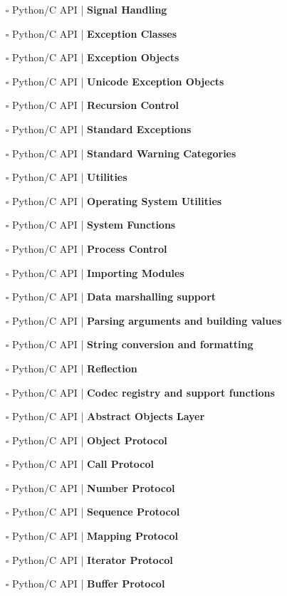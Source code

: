 \documentclass[a4, landscape, 12pt]{article}
\newcommand{\checkbox}{$\square$}%
\begin{document}
\begin{itemize}
{}
\item [\checkbox]  Python/C API | \textbf{ Signal Handling
}
\item [\checkbox]  Python/C API | \textbf{ Exception Classes
}
\item [\checkbox]  Python/C API | \textbf{ Exception Objects
}
\item [\checkbox]  Python/C API | \textbf{ Unicode Exception Objects
}
\item [\checkbox]  Python/C API | \textbf{ Recursion Control
}
\item [\checkbox]  Python/C API | \textbf{ Standard Exceptions
}
\item [\checkbox]  Python/C API | \textbf{ Standard Warning Categories
}
\item [\checkbox]  Python/C API | \textbf{ Utilities
}
\item [\checkbox]  Python/C API | \textbf{ Operating System Utilities
}
\item [\checkbox]  Python/C API | \textbf{ System Functions
}
\item [\checkbox]  Python/C API | \textbf{ Process Control
}
\item [\checkbox]  Python/C API | \textbf{ Importing Modules
}
\item [\checkbox]  Python/C API | \textbf{ Data marshalling support
}
\item [\checkbox]  Python/C API | \textbf{ Parsing arguments and building values
}
\item [\checkbox]  Python/C API | \textbf{ String conversion and formatting
}
\item [\checkbox]  Python/C API | \textbf{ Reflection
}
\item [\checkbox]  Python/C API | \textbf{ Codec registry and support functions
}
\item [\checkbox]  Python/C API | \textbf{ Abstract Objects Layer
}
\item [\checkbox]  Python/C API | \textbf{ Object Protocol
}
\item [\checkbox]  Python/C API | \textbf{ Call Protocol
}
\item [\checkbox]  Python/C API | \textbf{ Number Protocol
}
\item [\checkbox]  Python/C API | \textbf{ Sequence Protocol
}
\item [\checkbox]  Python/C API | \textbf{ Mapping Protocol
}
\item [\checkbox]  Python/C API | \textbf{ Iterator Protocol
}
\item [\checkbox]  Python/C API | \textbf{ Buffer Protocol
}
\end{itemize}
\end{document}
